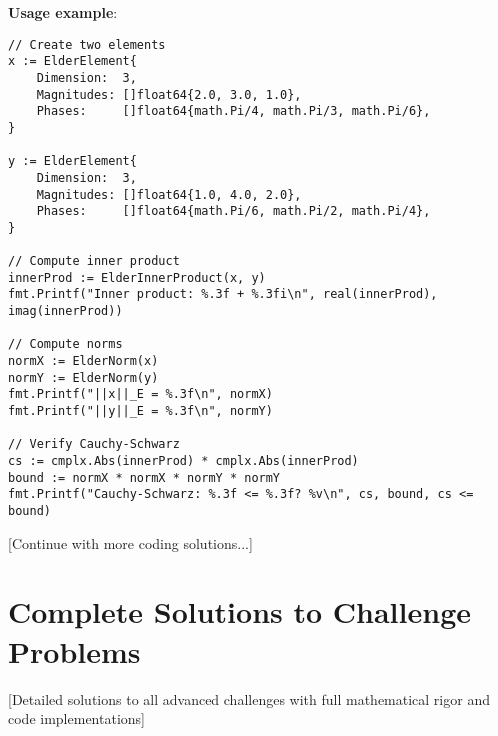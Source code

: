 \textbf{Usage example}:

\begin{lstlisting}[style=golang]
// Create two elements
x := ElderElement{
    Dimension:  3,
    Magnitudes: []float64{2.0, 3.0, 1.0},
    Phases:     []float64{math.Pi/4, math.Pi/3, math.Pi/6},
}

y := ElderElement{
    Dimension:  3,
    Magnitudes: []float64{1.0, 4.0, 2.0},
    Phases:     []float64{math.Pi/6, math.Pi/2, math.Pi/4},
}

// Compute inner product
innerProd := ElderInnerProduct(x, y)
fmt.Printf("Inner product: %.3f + %.3fi\n", real(innerProd), imag(innerProd))

// Compute norms
normX := ElderNorm(x)
normY := ElderNorm(y)
fmt.Printf("||x||_E = %.3f\n", normX)
fmt.Printf("||y||_E = %.3f\n", normY)

// Verify Cauchy-Schwarz
cs := cmplx.Abs(innerProd) * cmplx.Abs(innerProd)
bound := normX * normX * normY * normY
fmt.Printf("Cauchy-Schwarz: %.3f <= %.3f? %v\n", cs, bound, cs <= bound)
\end{lstlisting}

[Continue with more coding solutions...]

\section{Complete Solutions to Challenge Problems}

[Detailed solutions to all advanced challenges with full mathematical rigor and code implementations]


